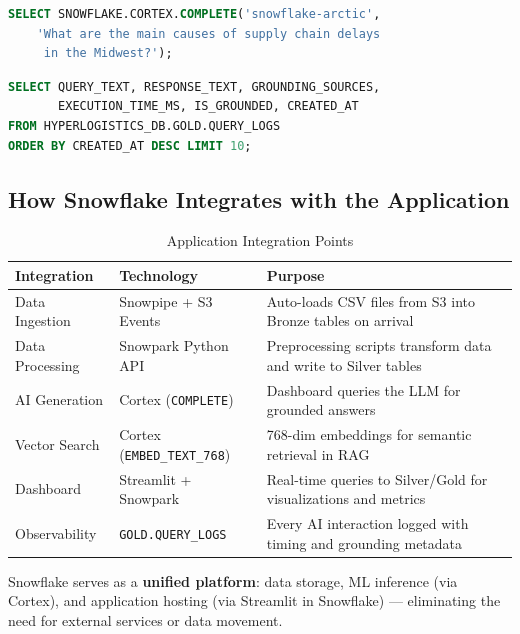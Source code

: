 \documentclass[14.5pt,letterpaper]{article}
\begin{document}
\begin{lstlisting}[language=SQL, caption={Query 4: AI-powered query via Snowflake Cortex}]
SELECT SNOWFLAKE.CORTEX.COMPLETE('snowflake-arctic',
    'What are the main causes of supply chain delays
     in the Midwest?');
\end{lstlisting}

\begin{lstlisting}[language=SQL, caption={Query 5: Audit trail of AI interactions}]
SELECT QUERY_TEXT, RESPONSE_TEXT, GROUNDING_SOURCES,
       EXECUTION_TIME_MS, IS_GROUNDED, CREATED_AT
FROM HYPERLOGISTICS_DB.GOLD.QUERY_LOGS
ORDER BY CREATED_AT DESC LIMIT 10;
\end{lstlisting}

\subsection{How Snowflake Integrates with the Application}

\begin{table}[H]
\centering
\caption{Application Integration Points}
\small
\begin{tabularx}{\textwidth}{@{}l l X@{}}
\toprule
\textbf{Integration} & \textbf{Technology} & \textbf{Purpose} \\
\midrule
Data Ingestion & Snowpipe + S3 Events & Auto-loads CSV files from S3 into Bronze tables on arrival \\
Data Processing & Snowpark Python API & Preprocessing scripts transform data and write to Silver tables \\
AI Generation & Cortex (\texttt{COMPLETE}) & Dashboard queries the LLM for grounded answers \\
Vector Search & Cortex (\texttt{EMBED\_TEXT\_768}) & 768-dim embeddings for semantic retrieval in RAG \\
Dashboard & Streamlit + Snowpark & Real-time queries to Silver/Gold for visualizations and metrics \\
Observability & \texttt{GOLD.QUERY\_LOGS} & Every AI interaction logged with timing and grounding metadata \\
\bottomrule
\end{tabularx}
\end{table}

Snowflake serves as a \textbf{unified platform}: data storage, ML inference (via Cortex), and application hosting (via Streamlit in Snowflake) --- eliminating the need for external services or data movement.
\end{document}
